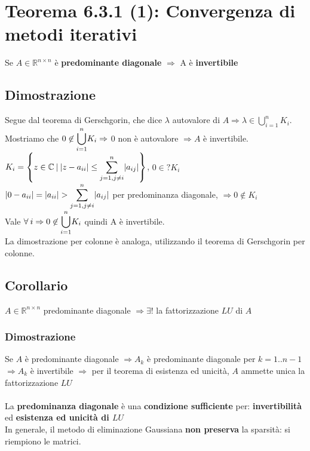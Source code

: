 \documentclass[10pt]{book}
\begin{document}
\section{Teorema 6.3.1 (1): Convergenza di metodi iterativi} Se $A \in \mathbb{R}^{n \times n}$ è \textbf{predominante diagonale} $\Rightarrow$ A è \textbf{invertibile}
\subsection{Dimostrazione} Segue dal teorema di Gerschgorin, che dice $\lambda$ autovalore di $A \Rightarrow \lambda \in \bigcup_{i=1}^n K_i$.\\
Mostriamo che $0 \not\in \mathlarger{\bigcup_{i=1}^n} K_i \Rightarrow$ 0 non è autovalore $\Rightarrow A$ è invertibile.\\
$K_i = \left\{ z \in \mathbb{C}\: |\: |z - a_{ii}| \leq \mathlarger{\sum_{j=1, j\neq i}^n} |a_{ij}|\right\}$, $0 \in? K_i$\\
$|0 - a_{ii}| = |a_{ii}| > \mathlarger{\sum_{j=1, j\neq i}^n} |a_{ij}|$ per predominanza diagonale, $\Rightarrow 0 \not\in K_i$\\
Vale $\forall\: i \Rightarrow 0 \not\in \mathlarger{\bigcup_{i=1}^n} K_i$ quindi A è invertibile.\\
La dimostrazione per colonne è analoga, utilizzando il teorema di Gerschgorin per colonne.
\subsection{Corollario} $A \in \mathbb{R}^{n \times n}$ predominante diagonale $\Rightarrow \exists!$ la fattorizzazione $LU$ di $A$
\subsubsection{Dimostrazione} Se $A$ è predominante diagonale $\Rightarrow A_k$ è predominante diagonale per $k = 1 .. n-1$\\
$\Rightarrow A_k$ è invertibile $\Rightarrow$ per il teorema di esistenza ed unicità, $A$ ammette unica la fattorizzazione $LU$
\paragraph{} La \textbf{predominanza diagonale} è una \textbf{condizione sufficiente} per: \textbf{invertibilità} ed \textbf{esistenza ed unicità di $LU$}\\
In generale, il metodo di eliminazione Gaussiana \textbf{non preserva} la sparsità: si riempiono le matrici.
\end{document}
